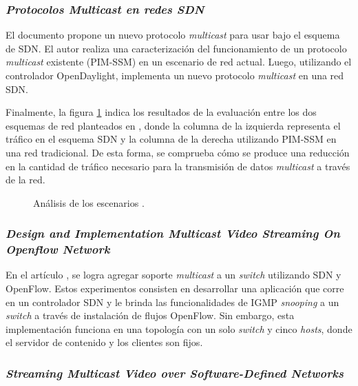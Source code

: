 \subsubsection*{\textit{Protocolos Multicast en redes SDN}}

El documento \parencite{tesis_granada} propone un nuevo protocolo \textit{multicast} para usar bajo el esquema de SDN. El autor realiza una caracterización del funcionamiento de un protocolo \textit{multicast} existente (PIM-SSM) en un escenario de red actual. Luego, utilizando el controlador OpenDaylight, implementa un nuevo protocolo \textit{multicast} en una red SDN. 

Finalmente, la figura \ref{fig:tesis_granada} indica los resultados de la evaluación entre los dos esquemas de red planteados en \parencite{tesis_granada}, donde la columna de la izquierda representa el tráfico en el esquema SDN y la columna de la derecha utilizando PIM-SSM en una red tradicional. De esta forma, se comprueba cómo se produce una reducción en la cantidad de tráfico necesario para la transmisión de datos \textit{multicast} a través de la red. 

\begin{figure}[th]
	\centering 
	\caption[Análisis de los escenarios.]{Análisis de los escenarios \parencite{tesis_granada}.}
	\label{fig:tesis_granada}
\end{figure}

\subsubsection*{\textit{Design and Implementation Multicast Video Streaming On Openflow Network}}

En el artículo \parencite{paper_desing_and_implementation}, se logra agregar soporte \textit{multicast} a un \textit{switch} utilizando SDN y OpenFlow. Estos experimentos consisten en desarrollar una aplicación que corre en un controlador SDN y le brinda las funcionalidades de IGMP \textit{snooping} a un \textit{switch} a través de instalación de flujos OpenFlow. Sin embargo, esta implementación funciona en una topología con un solo \textit{switch} y cinco \textit{hosts}, donde el servidor de contenido y los clientes son fijos.

\subsubsection*{\textit{Streaming Multicast Video over Software-Defined Networks}}

